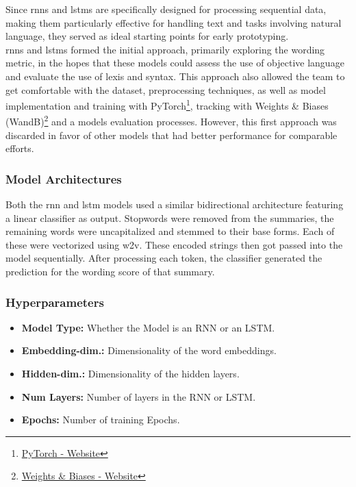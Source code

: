 Since \glspl{rnn} and \glspl{lstm} are specifically designed for processing sequential data, making them particularly effective for handling text and tasks involving natural language, they served as ideal starting points for early prototyping.\\

\glspl{rnn} and \glspl{lstm} formed the initial approach, primarily exploring the wording metric, in the hopes that these models could assess the use of objective language and evaluate the use of lexis and syntax. This approach also allowed the team to get comfortable with the dataset, preprocessing techniques, as well as model implementation and training with PyTorch\footnote{\href{https://pytorch.org/}{PyTorch - Website}}, tracking with Weights \& Biases (WandB)\footnote{\href{https://wandb.ai/site}{Weights \& Biases - Website}} and a models evaluation processes. However, this first approach was discarded in favor of other models that had better performance for comparable efforts.

\subsubsection{Model Architectures}
Both the \gls{rnn} and \gls{lstm} models used a similar bidirectional architecture featuring a linear classifier as output. Stopwords were removed from the summaries, the remaining words were uncapitalized and stemmed to their base forms. Each of these  were vectorized using \gls{w2v}. These encoded strings then got passed into the model sequentially. After processing each \gls{token}, the classifier generated the prediction for the wording score of that summary.\\ 

\subsubsection{Hyperparameters}
\begin{itemize}
    \item \textbf{Model Type:} Whether the Model is an RNN or an LSTM.
	\item \textbf{Embedding-dim.:} Dimensionality of the word embeddings.
	\item \textbf{Hidden-dim.:} Dimensionality of the hidden layers.
	\item \textbf{Num Layers:} Number of layers in the RNN or LSTM.
	\item \textbf{Epochs:} Number of training Epochs.
\end{itemize}

